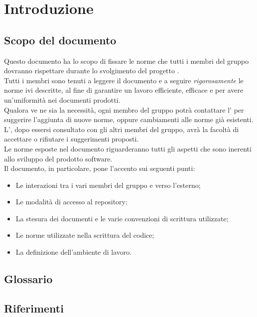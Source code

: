 \section{Introduzione}
\label{introduzione}
\subsection{Scopo del documento}
\label{scopodocumento}
Questo documento ha lo scopo di fissare le norme che tutti i membri del gruppo \authorName{}
dovranno rispettare durante lo svolgimento del progetto \project.
\\Tutti i membri sono tenuti a leggere il documento e a seguire \textit{rigorosamente} le norme ivi descritte, al fine di garantire un lavoro efficiente, efficace e per avere un'uniformità nei documenti prodotti.
\\Qualora ve ne sia la necessità, ogni membro del gruppo potrà contattare l'\administrator{} per suggerire l'aggiunta di nuove norme, oppure cambiamenti alle norme già esistenti.\\ 
L'\administrator{}, dopo essersi consultato con gli altri membri del gruppo, avrà la facoltà di accettare o rifiutare i suggerimenti proposti.
\\Le norme esposte nel documento riguarderanno tutti gli aspetti che sono inerenti allo sviluppo del prodotto software.
\\Il documento, in particolare, pone l'accento sui seguenti punti:
\begin{itemize}
\item Le interazioni tra i vari membri del gruppo e verso l'esterno;
\item Le modalità di accesso al repository\glossario{};
\item La stesura dei documenti e le varie convenzioni di scrittura utilizzate;
\item Le norme utilizzate nella scrittura del codice;
\item La definizione dell'ambiente di lavoro.
\end{itemize}

\subsection{Glossario}
\label{glossario}
\glossIntro{}

\subsection{Riferimenti}
\label{riferimenti}

